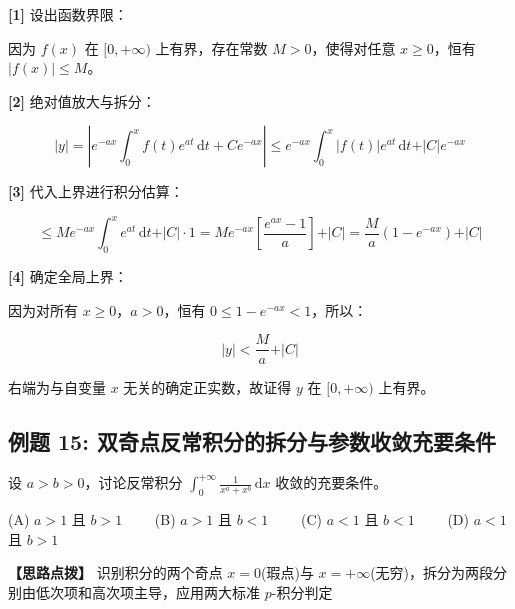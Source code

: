 \documentclass[11pt,a4paper,UTF8]{ctexart}
\begin{document}
\begin{solbox}[分步推导与答题规范]
\textbf{[1]} 设出函数界限：

因为 $f(x)$ 在 $[0, +\infty)$ 上有界，存在常数 $M > 0$，使得对任意 $x \geqslant 0$，恒有 $\vert{}f(x)\vert{} \leqslant M$。

\textbf{[2]} 绝对值放大与拆分：


\begin{equation*}
\vert{}y\vert{} = \left\vert{} e^{-ax}\int_0^x f(t)e^{at}\,\mathrm{d}t + C e^{-ax} \right\vert{} \leqslant e^{-ax}\int_0^x \vert{}f(t)\vert{}e^{at}\,\mathrm{d}t + \vert{}C\vert{}e^{-ax}
\end{equation*}


\textbf{[3]} 代入上界进行积分估算：


\begin{equation*}
\leqslant M e^{-ax} \int_0^x e^{at}\,\mathrm{d}t + \vert{}C\vert{} \cdot 1 = M e^{-ax} \left[ \frac{e^{ax} - 1}{a} \right] + \vert{}C\vert{} = \frac{M}{a}(1 - e^{-ax}) + \vert{}C\vert{}
\end{equation*}


\textbf{[4]} 确定全局上界：

因为对所有 $x \geqslant 0$，$a > 0$，恒有 $0 \leqslant 1 - e^{-ax} < 1$，所以：


\begin{equation*}
\vert{}y\vert{} < \frac{M}{a} + \vert{}C\vert{}
\end{equation*}


右端为与自变量 $x$ 无关的确定正实数，故证得 $y$ 在 $[0, +\infty)$ 上有界。
\end{solbox}


\subsection{例题 15: 双奇点反常积分的拆分与参数收敛充要条件}

设 $a > b > 0$，讨论反常积分 $\int_0^{+\infty} \frac{1}{x^a + x^b}\,\mathrm{d}x$ 收敛的充要条件。

(A) $a > 1$ 且 $b > 1 \qquad$ (B) $a > 1$ 且 $b < 1 \qquad$ (C) $a < 1$ 且 $b < 1 \qquad$ (D) $a < 1$ 且 $b > 1$

\textbf{\color{DeepPurple}【思路点拨】} 识别积分的两个奇点 $x = 0$(瑕点)与 $x = +\infty$(无穷)，拆分为两段分别由低次项和高次项主导，应用两大标准 $p$-积分判定
\end{document}
